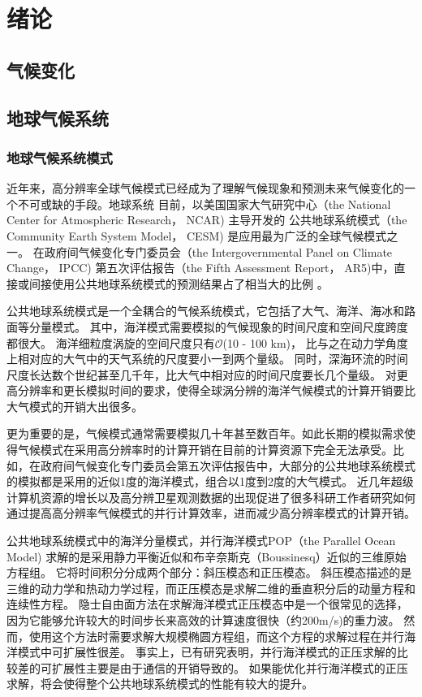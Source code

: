 \chapter{绪论}
\label{cha:intro}

\section{气候变化}

\section{地球气候系统}
\subsection{地球气候系统模式}


近年来，高分辨率全球气候模式已经成为了理解气候现象和预测未来气候变化的一个不可或缺的手段。地球系统
目前，以美国国家大气研究中心（the National Center for Atmospheric Research， NCAR) 主导开发的
公共地球系统模式（the Community Earth System Model， CESM) 是应用最为广泛的全球气候模式之一。
在政府间气候变化专门委员会（the
Intergovernmental Panel on Climate Change， IPCC) 第五次评估报告（the Fifth Assessment
Report， AR5)中，直接或间接使用公共地球系统模式的预测结果占了相当大的比例 \cite{stocker2013ipcc}。
 

公共地球系统模式是一个全耦合的气候系统模式，它包括了大气、海洋、海冰和路面等分量模式。
其中，海洋模式需要模拟的气候现象的时间尺度和空间尺度跨度都很大。 
海洋细粒度涡旋的空间尺度只有$\mathcal{O}$(10 - 100 km)， 比与之在动力学角度上相对应的大气中的天气系统的尺度要小一到两个量级。
同时，深海环流的时间尺度长达数个世纪甚至几千年，比大气中相对应的时间尺度要长几个量级。
对更高分辨率和更长模拟时间的要求，使得全球涡分辨的海洋气候模式的计算开销要比大气模式的开销大出很多\cite{bryan2010frontal,mcclean2011prototype,graham2014importance}。


更为重要的是，气候模式通常需要模拟几十年甚至数百年。如此长期的模拟需求使得气候模式在采用高分辨率时的计算开销在目前的计算资源下完全无法承受。比如，在政府间气候变化专门委员会第五次评估报告中，大部分的公共地球系统模式的模拟都是采用的近似1度的海洋模式，组合以1度到2度的大气模式。
近几年超级计算机资源的增长以及高分辨卫星观测数据的出现促进了很多科研工作者研究如何通过提高高分辨率气候模式的并行计算效率，进而减少高分辨率模式的计算开销。


公共地球系统模式中的海洋分量模式，并行海洋模式POP（the Parallel Ocean Model) 求解的是采用静力平衡近似和布辛奈斯克（Boussinesq）近似的三维原始方程组。 
它将时间积分分成两个部分：斜压模态和正压模态。 
斜压模态描述的是三维的动力学和热动力学过程，而正压模态是求解二维的垂直积分后的动量方程和连续性方程。
隐士自由面方法在求解海洋模式正压模态中是一个很常见的选择，因为它能够允许较大的时间步长来高效的计算速度很快（约200m/s)的重力波。
然而，使用这个方法时需要求解大规模椭圆方程组，而这个方程的求解过程在并行海洋模式中可扩展性很差。
事实上，已有研究表明，并行海洋模式的正压求解的比较差的可扩展性主要是由于通信的开销导致的\cite{Worley:2011:PCE:2063384.2063457}。 
如果能优化并行海洋模式的正压求解，将会使得整个公共地球系统模式的性能有较大的提升\cite{dennis2012computational}。 

